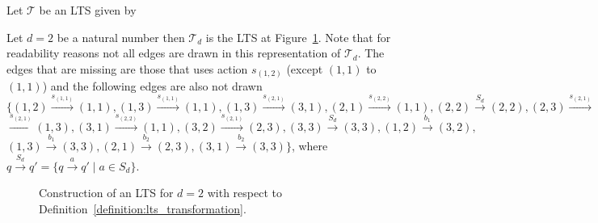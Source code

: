 \begin{example}
    Let $\mathcal{T}$ be an LTS given by
    \begin{center}
    \end{center}
    Let $d = 2$ be a natural number then $\mathcal{T}_d$ is the
    LTS at Figure~\ref{figure:t_d}. Note that for readability reasons not all edges are drawn in this representation of $\mathcal{T}_d$.
    The edges that are missing are those that uses action $s_{(1, 2)}$ (except $(1, 1)$ to $(1,
    1)$) and the following edges are also not drawn
    $\{(1, 2) \overset{s_{(1, 1)}}{\rightarrow} (1, 1),
    (1, 3) \overset{s_{(1, 1)}}{\rightarrow} (1, 1),
    (1, 3) \overset{s_{(2, 1)}}{\rightarrow} (3, 1),
    (2, 1) \overset{s_{(2, 2)}}{\rightarrow} (1, 1),
    (2, 2) \overset{S_d}{\rightarrow} (2, 2),
    (2, 3) \overset{s_{(2, 1)}}{\rightarrow} (3, 2),
    (3, 1) $ $\overset{s_{(2, 1)}}{\rightarrow} (1, 3),
    (3, 1) \overset{s_{(2, 2)}}{\rightarrow} (1, 1),
    (3, 2) \overset{s_{(2, 1)}}{\rightarrow} (2, 3),
    (3, 3) \overset{S_d}{\rightarrow} (3, 3),
    (1, 2) \overset{b_1}{\rightarrow} (3, 2),
    $ $(1, 3) \overset{b_1}{\rightarrow} (3, 3),
    (2, 1) \overset{b_2}{\rightarrow} (2, 3),
    (3, 1) \overset{b_2}{\rightarrow} (3, 3)
    \}$, where $q \overset{S_d}{\rightarrow} q' =
    \{q \overset{a}{\rightarrow} q' \mid a \in S_d\}$.
        \begin{figure}
        \caption{Construction of an LTS for $d=2$ with respect to Definition~\ref{definition:lts_transformation}.}
    \label{figure:t_d}
    \begin{center}
\end{center}
\end{figure}
\end{example}

